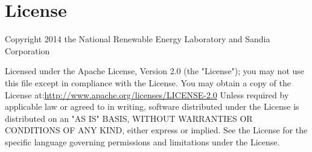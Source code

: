 \chapter*{License}
Copyright 2014 the National Renewable Energy Laboratory and Sandia Corporation \newline
 
Licensed under the Apache License, Version 2.0 (the "License"); you may not use this file except in compliance with the License. You may obtain a copy of the License at:\newline\newline    \href{http://www.apache.org/licenses/LICENSE-2.0}{http://www.apache.org/licenses/LICENSE-2.0} \newline\newline Unless required by applicable law or agreed to in writing, software distributed under the License is distributed on an "AS IS" BASIS, WITHOUT WARRANTIES OR CONDITIONS OF ANY KIND, either express or implied. See the License for the specific language governing permissions and limitations under the License.